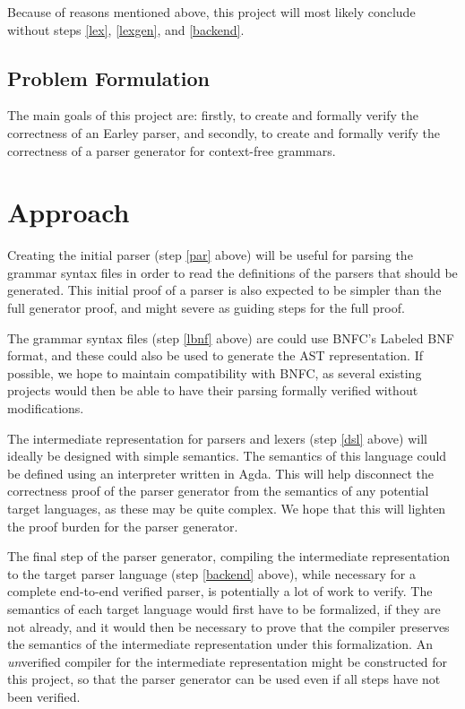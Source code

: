 \documentclass{article}
\begin{document}
		Because of reasons mentioned above, this project will most likely
		conclude without steps \ref{lex}, \ref{lexgen}, and \ref{backend}.

	\subsection{Problem Formulation}

		The main goals of this project are: firstly, to create and formally
		verify the correctness of an Earley parser, and secondly, to create and
		formally verify the correctness of a parser generator for context-free
		grammars.


\section{Approach}

	Creating the initial parser (step \ref{par} above) will be useful for
	parsing the grammar syntax files in order to read the definitions of the
	parsers that should be generated. This initial proof of a parser is also
	expected to be simpler than the full generator proof, and might severe as
	guiding steps for the full proof.

	The grammar syntax files (step \ref{lbnf} above) are could use BNFC's
	Labeled BNF format, and these could also be used to generate the AST
	representation. If possible, we hope to maintain compatibility with BNFC,
	as several existing projects would then be able to have their parsing
	formally verified without modifications.

	The intermediate representation for parsers and lexers (step \ref{dsl}
	above) will ideally be designed with simple semantics. The semantics of
	this language could be defined using an interpreter written in Agda. This
	will help disconnect the correctness proof of the parser generator from the
	semantics of any potential target languages, as these may be quite complex.
	We hope that this will lighten the proof burden for the parser generator.


	The final step of the parser generator, compiling the intermediate
	representation to the target parser language (step \ref{backend} above),
	while necessary for a complete end-to-end verified parser, is potentially a
	lot of work to verify. The semantics of each target language would first
	have to be formalized, if they are not already, and it would then be
	necessary to prove that the compiler preserves the semantics of the
	intermediate representation under this formalization. An \emph{un}verified
	compiler for the intermediate representation might be constructed for this
	project, so that the parser generator can be used even if all steps have
	not been verified.
\end{document}
